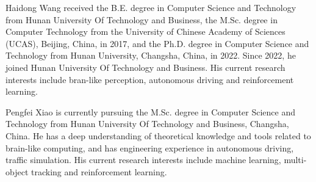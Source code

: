 \documentclass[lettersize,journal]{IEEEtran}
\begin{document}
\newpage
\begin{IEEEbiography}{Haidong Wang}
	 received the B.E. degree in Computer Science and Technology from Hunan University Of Technology and Business, the M.Sc. degree in Computer Technology from the University of Chinese Academy of Sciences (UCAS), Beijing, China, in 2017, and the Ph.D. degree in Computer Science and Technology from Hunan University, Changsha, China, in 2022. Since 2022, he joined Hunan University Of Technology and Business. His current research interests include bran-like perception, autonomous driving and reinforcement learning.
\end{IEEEbiography}

\begin{IEEEbiography}{Pengfei Xiao}
	is currently pursuing the M.Sc. degree in Computer Science and Technology from Hunan University Of Technology and Business, Changsha, China. He has a deep understanding of theoretical knowledge and tools related to brain-like computing, and has engineering experience in autonomous driving, traffic simulation. His current research interests include machine learning, multi-object tracking and reinforcement learning.
\end{IEEEbiography}

\vfill
\end{document}
